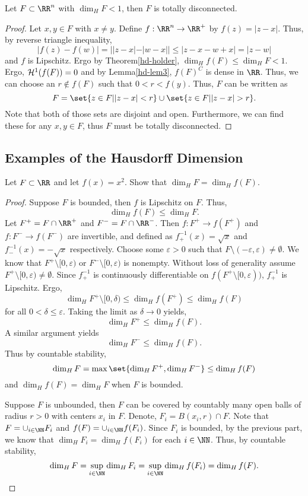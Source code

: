 \begin{thm}
	Let $F\subset\RR^n$ with $\dim_H F < 1$, then $F$ is totally disconnected.
\end{thm}

\begin{proof}
	Let $x,y\in F$ with $x\neq y$.
	Define $f:\RR^n\rightarrow\RR^+$ by $f(z)=|z-x|$.
	Thus, by reverse triangle inequality,
	\[
		|f(z)-f(w)|=||z-x|-|w-x||\leq|z-x-w+x|=|z-w|
	\]
	and $f$ is Lipschitz.
	Ergo by Theorem\autoref{hd-holder}, $\dim_H f(F) \leq \dim_H F < 1$.
	Ergo, $\mathcal{H}^1(f(F))=0$ and by Lemma\autoref{hd-lem3}, ${f(F)}^C$ is dense in $\RR$.
	Thus, we can choose an $r\notin f(F)$ such that $0<r<f(y)$.
	Thus, $F$ can be written as
	\[
		F=\set{z\in F| |z-x|< r}\cup\set{z\in F| |z-x| >r}.
	\]
	Note that both of those sets are disjoint and open.
	Furthermore, we can find these for any $x,y\in F$, thus $F$ must be totally disconnected.
\end{proof}

\subsection{Examples of the Hausdorff Dimension}

\begin{example}
	Let $F\subset\RR$ and let $f(x)=x^2$.
	Show that $\dim_H F = \dim_H f(F)$.
\end{example}

\begin{proof}
	Suppose $F$ is bounded, then $f$ is Lipschitz on $F$.
	Thus,
	\[
		\dim_H f(F) \leq \dim_H F.
	\]
	Let $F^+=F\cap\RR^+$ and $F^-=F\cap\RR^-$.
	Then $f:F^+\rightarrow f(F^+)$ and $f:F^-\rightarrow f(F^-)$ are invertible, and defined as $f^{-1}_+(x)=\sqrt{x}$ and $f^{-1}_-(x)=-\sqrt{x}$ respectively.
	Choose some $\varepsilon>0$ such that $F\setminus(-\varepsilon,\varepsilon)\neq\emptyset$.
	We know that $F^+\setminus[0,\varepsilon)$ or $F^-\setminus[0,\varepsilon)$ is nonempty. %
	Without loss of generality assume $F^+\setminus[0,\varepsilon)\neq\emptyset$. %
	Since $f^{-1}_+$ is continuously differentiable on $f(F^+\setminus[0,\varepsilon))$, $f^{-1}_+$ is Lipschitz. %
	Ergo,
	\[
		\dim_H F^+\setminus[0,\delta) \leq \dim_H f(F^+)\leq \dim_H f(F) %
	\]
	for all $0 < \delta \leq \varepsilon$.
	Taking the limit as $\delta\rightarrow 0$ yields,
	\[
		\dim_H F^+ \leq \dim_H f(F).
	\]
	A similar argument yields
	\[
		\dim_H F^- \leq \dim_H f(F).
	\]
	Thus by countable stability,
	\[
		\dim_H F = \max \set{\dim_H F^+, \dim_H F^-}\leq \dim_H f(F)
	\]
	and $\dim_H f(F)=\dim_H F$ when $F$ is bounded.

	Suppose $F$ is unbounded, then $F$ can be covered by countably many open balls of radius $r>0$ with centers $x_i$ in $F$.
	Denote, $F_i=B(x_i,r)\cap F$.
	Note that $F=\cup_{i\in\NN} F_i$ and $f(F)=\cup_{i\in\NN} f(F_i)$.
	Since $F_i$ is bounded, by the previous part, we know that $\dim_H F_i = \dim_H f(F_i)$ for each $i\in\NN$.
	Thus, by countable stability,
	\[
		\dim_H F = \sup\limits_{i\in\NN} \dim_H F_i = \sup\limits_{i\in\NN} \dim_H f(F_i)=\dim_H f(F).
	\]
\end{proof}

